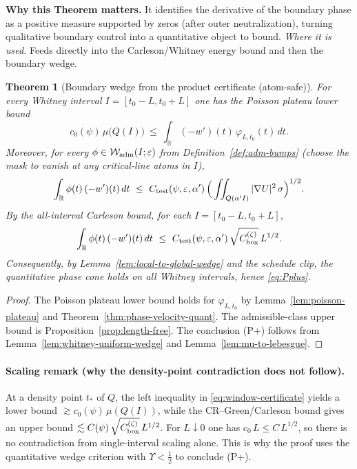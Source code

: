 \documentclass[11pt]{article}
\newtheorem{theorem}{Theorem}[section]
\theoremstyle{definition}
\theoremstyle{remark}
\newcommand{\R}{\mathbb{R}}
\begin{document}
\vspace{1.0cm}
\noindent\textbf{Why this Theorem matters.} It identifies the derivative of the boundary phase as a positive measure supported by zeros (after outer neutralization), turning qualitative boundary control into a quantitative object to bound.
\noindent\textit{Where it is used.} Feeds directly into the Carleson/Whitney energy bound and then the boundary wedge.
\begin{theorem}[Boundary wedge from the product certificate (atom-safe)]\label{thm:psc-certificate-stage2}
For every Whitney interval $I=[t_0-L,t_0+L]$ one has the Poisson plateau lower bound
\[
  c_0(\psi)\,\mu\!\big(Q(I)\big)\ \le\ \int_{\R} (-w')(t)\,\varphi_{L,t_0}(t)\,dt.
\tag{\*}\label{eq:window-certificate}
\]
Moreover, for every $\phi\in\mathcal W_{\rm adm}(I;\varepsilon)$ from Definition~\ref{def:adm-bumps} (choose the mask to vanish at any critical-line atoms in $I$),
\[
  \int_{\R} \phi(t)\,(-w')(t)\,dt\ \le\ C_{\rm test}(\psi,\varepsilon,\alpha')\,\Big(\iint_{Q(\alpha'I)} |\nabla U|^2\,\sigma\Big)^{1/2}.
\]
By the all-interval Carleson bound, for each $I=[t_0-L,t_0+L]$,
\[
  \int_{\R} \phi(t)\,(-w')(t)\,dt\ \le\ C_{\rm test}(\psi,\varepsilon,\alpha')\,\sqrt{C_{\rm box}^{(\zeta)}}\,L^{1/2}.
\]
Consequently, by Lemma~\ref{lem:local-to-global-wedge} and the schedule clip, the quantitative phase cone holds on all Whitney intervals, hence \eqref{eq:Pplus}.
\end{theorem}
\begin{proof}
The Poisson plateau lower bound holds for $\varphi_{L,t_0}$ by Lemma~\ref{lem:poisson-plateau} and Theorem~\ref{thm:phase-velocity-quant}. The admissible-class upper bound is Proposition~\ref{prop:length-free}. The conclusion \textup{(P+)} follows from Lemma~\ref{lem:whitney-uniform-wedge} and Lemma~\ref{lem:mu-to-lebesgue}.
\end{proof}







\vspace{1.0cm}
\paragraph{Scaling remark (why the density-point contradiction does not follow).}
At a density point $t_*$ of $Q$, the left inequality in \eqref{eq:window-certificate} yields a lower bound $\gtrsim c_0(\psi)\,\mu(Q(I))$, while the CR–Green/Carleson bound gives an upper bound $\lesssim C(\psi)\,\sqrt{C_{\rm box}^{(\zeta)}}\,L^{1/2}$. For $L\downarrow 0$ one has $c_0\,L\le C\,L^{1/2}$, so there is no contradiction from single-interval scaling alone. This is why the proof uses the quantitative wedge criterion with $\Upsilon<\tfrac12$ to conclude (P+).
\end{document}

